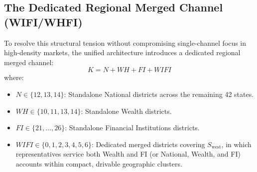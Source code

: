 \documentclass[11pt,a4paper]{article}
\theoremstyle{plain}
\theoremstyle{definition}
\begin{document}
\subsection{The Dedicated Regional Merged Channel (WIFI/WHFI)}
To resolve this structural tension without compromising single-channel focus in high-density markets, the unified architecture introduces a dedicated regional merged channel:
\begin{equation}
K = N + WH + FI + WIFI
\end{equation}
where:
\begin{itemize}[leftmargin=1.5em]
    \item $N \in \{12, 13, 14\}$: Standalone National districts across the remaining 42 states.
    \item $WH \in \{10, 11, 13, 14\}$: Standalone Wealth districts.
    \item $FI \in \{21, \dots, 26\}$: Standalone Financial Institutions districts.
    \item $WIFI \in \{0, 1, 2, 3, 4, 5, 6\}$: Dedicated merged districts covering $S_{\text{west}}$, in which representatives service both Wealth and FI (or National, Wealth, and FI) accounts within compact, drivable geographic clusters.
\end{itemize}
\end{document}
